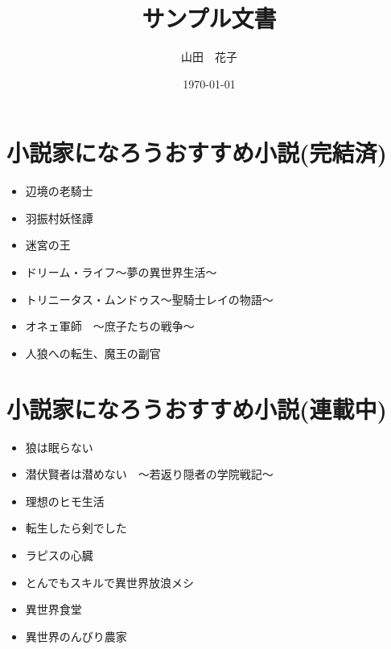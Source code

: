 \documentclass[uplatex]{jsarticle}
\begin{document}
\title{\huge サンプル文書}
\author{山田　花子}
\date{\today}
\maketitle

\section{小説家になろうおすすめ小説(完結済)}
\begin{itemize}
  \item 辺境の老騎士
  \item 羽振村妖怪譚
  \item 迷宮の王
  \item ドリーム・ライフ～夢の異世界生活～
  \item トリニータス・ムンドゥス～聖騎士レイの物語～
  \item オネェ軍師　～庶子たちの戦争～
  \item 人狼への転生、魔王の副官
\end{itemize}

\section{小説家になろうおすすめ小説(連載中)}
\begin{itemize}
  \item 狼は眠らない
  \item 潜伏賢者は潜めない　～若返り隠者の学院戦記～
  \item 理想のヒモ生活
  \item 転生したら剣でした
  \item ラピスの心臓
  \item とんでもスキルで異世界放浪メシ
  \item 異世界食堂
  \item 異世界のんびり農家
\end{itemize}
\end{document}
